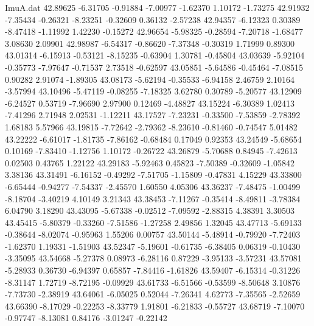 \begin{filecontents}{ImuA.dat}
  42.89625   -6.31705   -0.91884   -7.00977   -1.62370    1.10172   -1.73275
  42.91932   -7.35434   -0.26321   -8.23251   -0.32609    0.36132   -2.57238
  42.94357   -6.12323    0.30389   -8.47418   -1.11992    1.42230   -0.15272
  42.96654   -5.98325   -0.28594   -7.20718   -1.68477    3.08630    2.09901
  42.98987   -6.54317   -0.86620   -7.37348   -0.30319    1.71999    0.89300
  43.01314   -6.15913   -0.53121   -8.15235   -0.63904    1.30781   -0.45804
  43.03639   -5.92104   -0.35773   -7.97647   -0.71537    2.73518   -0.62597
  43.05851   -5.64586   -0.45464   -7.08515    0.90282    2.91074   -1.89305
  43.08173   -5.62194   -0.35533   -6.94158    2.46759    2.10164   -3.57994
  43.10496   -5.47119   -0.08255   -7.18325    3.62780    0.30789   -5.20577
  43.12909   -6.24527    0.53719   -7.96690    2.97900    0.12469   -4.48827
  43.15224   -6.30389    1.02413   -7.41296    2.71948    2.02531   -1.12211
  43.17527   -7.23231   -0.33500   -7.53859   -2.78392    1.68183    5.57966
  43.19815   -7.72642   -2.79362   -8.23610   -0.81460   -0.74547    5.01482
  43.22222   -6.61017   -1.81735   -7.86162   -0.68484    0.17049    0.92353
  43.24549   -5.68654    0.10169   -7.83410   -1.12756    1.10172   -0.26722
  43.26879   -5.70688    0.84945   -7.42613    0.02503    0.43765    1.22122
  43.29183   -5.92463    0.45823   -7.50389   -0.32609   -1.05842    3.38136
  43.31491   -6.16152   -0.49292   -7.51705   -1.15809   -0.47831    4.15229
  43.33800   -6.65444   -0.94277   -7.54337   -2.45570    1.60550    4.05306
  43.36237   -7.48475   -1.00499   -8.18704   -3.40219    4.10149    3.21343
  43.38453   -7.11267   -0.35414   -8.49811   -3.78384    6.04790    3.18290
  43.43095   -5.67338   -0.02512   -7.09592   -2.88315    4.38391    3.30503
  43.45415   -5.80379   -0.33260   -7.51586   -1.27258    2.49856    1.32045
  43.47713   -5.69133   -0.38644   -8.02074   -0.95963    1.55206    0.00757
  43.50144   -5.48914   -0.79920   -7.72403   -1.62370    1.19331   -1.51903
  43.52347   -5.19601   -0.61735   -6.38405    0.06319   -0.10430   -3.35095
  43.54668   -5.27378    0.08973   -6.28116    0.87229   -3.95133   -3.57231
  43.57081   -5.28933    0.36730   -6.94397    0.65857   -7.84416   -1.61826
  43.59407   -6.15314   -0.31226   -8.31147    1.72719   -8.72195   -0.09929
  43.61733   -6.51566   -0.53599   -8.50648    3.10876   -7.73730   -2.38919
  43.64061   -6.05025    0.52044   -7.26341    4.62773   -7.35565   -2.52659
  43.66390   -8.17029   -0.22253   -8.33779    1.91801   -6.21833   -0.55727
  43.68719   -7.10070   -0.97747   -8.13081    0.84176   -3.01247   -0.22142

\end{filecontents}
